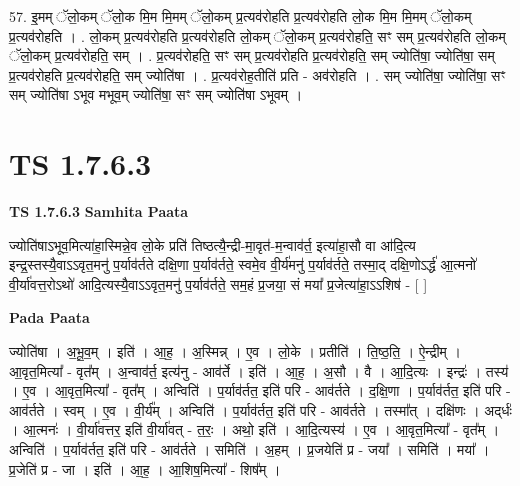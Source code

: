 \documentclass[17pt]{extarticle}
\begin{document}
57. इ॒मम् ॅलो॒कम् ॅलो॒क मि॒म मि॒मम् ॅलो॒कम् प्र॒त्यव॑रोहति प्र॒त्यव॑रोहति लो॒क मि॒म मि॒मम् ॅलो॒कम् प्र॒त्यव॑रोहति । . लो॒कम् प्र॒त्यव॑रोहति प्र॒त्यव॑रोहति लो॒कम् ॅलो॒कम् प्र॒त्यव॑रोहति॒ सꣳ सम् प्र॒त्यव॑रोहति लो॒कम् ॅलो॒कम् प्र॒त्यव॑रोहति॒ सम् । . प्र॒त्यव॑रोहति॒ सꣳ सम् प्र॒त्यव॑रोहति प्र॒त्यव॑रोहति॒ सम् ज्योति॑षा॒ ज्योति॑षा॒ सम् प्र॒त्यव॑रोहति प्र॒त्यव॑रोहति॒ सम् ज्योति॑षा । . प्र॒त्यव॑रोह॒तीति॑ प्रति - अव॑रोहति । . सम् ज्योति॑षा॒ ज्योति॑षा॒ सꣳ सम् ज्योति॑षा ऽभूव मभूव॒म् ज्योति॑षा॒ सꣳ सम् ज्योति॑षा ऽभूवम् । \newline
\pagebreak
{}
\section*{ TS 1.7.6.3 }

\textbf{TS 1.7.6.3 } \newline
\textbf{Samhita Paata} \newline

ज्योति॑षाऽभूव॒मित्या॑हा॒स्मिन्ने॒व लो॒के प्रति॑ तिष्ठत्यै॒न्द्री-मा॒वृत॑-म॒न्वाव॑र्त॒ इत्या॑हा॒सौ वा आ॑दि॒त्य इन्द्र॒स्तस्यै॒वाऽऽवृत॒मनु॑ प॒र्याव॑र्तते दक्षि॒णा प॒र्याव॑र्तते॒ स्वमे॒व वी॒र्य॑मनु॑ प॒र्याव॑र्तते॒ तस्मा॒द् दक्षि॒णोऽर्द्ध॑ आ॒त्मनो॑ वी॒र्या॑वत्त॒रोऽथो॑ आदि॒त्यस्यै॒वाऽऽवृत॒मनु॑ प॒र्याव॑र्तते॒ सम॒हं प्र॒जया॒ सं मया᳚ प्र॒जेत्या॑हा॒ऽऽशिष॑ - [ ] \newline

\textbf{Pada Paata} \newline

ज्योति॑षा । अ॒भू॒व॒म् । इति॑ । आ॒ह॒ । अ॒स्मिन्न् । ए॒व । लो॒के । प्रतीति॑ । ति॒ष्ठ॒ति॒ । ऐ॒न्द्रीम् । आ॒वृत॒मित्या᳚ - वृत᳚म् । अ॒न्वाव॑र्त॒ इत्य॑नु - आव॑र्ते । इति॑ । आ॒ह॒ । अ॒सौ । वै । आ॒दि॒त्यः । इन्द्रः॑ । तस्य॑ । ए॒व । आ॒वृत॒मित्या᳚ - वृत᳚म् । अन्विति॑ । प॒र्याव॑र्तत॒ इति॑ परि - आव॑र्तते । द॒क्षि॒णा । प॒र्याव॑र्तत॒ इति॑ परि - आव॑र्तते । स्वम् । ए॒व । वी॒र्य᳚म् । अन्विति॑ । प॒र्याव॑र्तत॒ इति॑ परि - आव॑र्तते । तस्मा᳚त् । दक्षि॑णः । अद्‌र्धः॑ । आ॒त्मनः॑ । वी॒र्या॑वत्तर॒ इति॑ वी॒र्या॑वत् - त॒रः॒ । अथो॒ इति॑ । आ॒दि॒त्यस्य॑ । ए॒व । आ॒वृत॒मित्या᳚ - वृत᳚म् । अन्विति॑ । प॒र्याव॑र्तत॒ इति॑ परि - आव॑र्तते । समिति॑ । अ॒हम् । प्र॒जयेति॑ प्र - जया᳚ । समिति॑ । मया᳚ । प्र॒जेति॑ प्र - जा । इति॑ । आ॒ह॒ । आ॒शिष॒मित्या᳚ - शिष᳚म् ।  \newline
\end{document}
